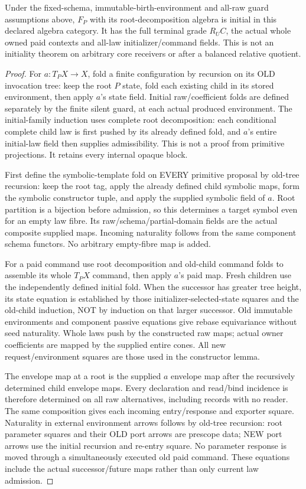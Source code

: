 \documentclass[11pt]{article}
\begin{document}
\begin{theorem}
Under the fixed-schema, immutable-birth-environment and all-raw guard assumptions above, $F_P$ with its root-decomposition algebra is initial in this declared algebra category. It has the full terminal grade $R_UC$, the actual whole owned paid contexts and all-law initializer/command fields. This is not an initiality theorem on arbitrary core receivers or after a balanced relative quotient.
\end{theorem}
\begin{proof}
For $a:T_PX\to X$, fold a finite configuration by recursion on its OLD invocation tree: keep the root $P$ state, fold each existing child in its stored environment, then apply $a$'s state field. Initial raw/coefficient folds are defined separately by the finite silent guard, at each actual produced environment. The initial-family induction uses complete root decomposition: each conditional complete child law is first pushed by its already defined fold, and $a$'s entire initial-law field then supplies admissibility. This is not a proof from primitive projections. It retains every internal opaque block.

First define the symbolic-template fold on EVERY primitive proposal by old-tree recursion: keep the root tag, apply the already defined child symbolic maps, form the symbolic constructor tuple, and apply the supplied symbolic field of $a$. Root partition is a bijection before admission, so this determines a target symbol even for an empty law fibre. Its raw/schema/partial-domain fields are the actual composite supplied maps. Incoming naturality follows from the same component schema functors. No arbitrary empty-fibre map is added.

For a paid command use root decomposition and old-child command folds to assemble its whole $T_PX$ command, then apply $a$'s paid map. Fresh children use the independently defined initial fold. When the successor has greater tree height, its state equation is established by those initializer-selected-state squares and the old-child induction, NOT by induction on that larger successor. Old immutable environments and component passive equations give rebase equivariance without seed naturality. Whole laws push by the constructed raw maps; actual owner coefficients are mapped by the supplied entire cones. All new request/environment squares are those used in the constructor lemma.

The envelope map at a root is the supplied $a$ envelope map after the recursively determined child envelope maps. Every declaration and read/bind incidence is therefore determined on all raw alternatives, including records with no reader. The same composition gives each incoming entry/response and exporter square. Naturality in external environment arrows follows by old-tree recursion: root parameter squares and their OLD port arrows are prescope data; NEW port arrows use the initial recursion and re-entry square. No parameter response is moved through a simultaneously executed old paid command. These equations include the actual successor/future maps rather than only current law admission.


\end{proof}
\end{document}
